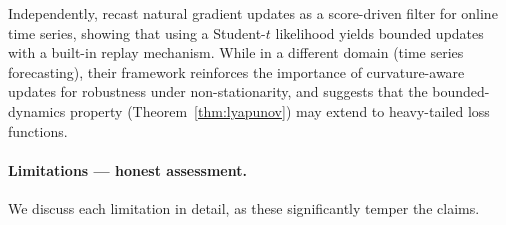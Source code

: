 \documentclass{article}
\theoremstyle{plain}
\theoremstyle{definition}
\theoremstyle{remark}
\begin{document}
Independently, \citet{urettini2026natsr} recast natural gradient updates as a score-driven filter for online time series, showing that using a Student-$t$ likelihood yields bounded updates with a built-in replay mechanism. While in a different domain (time series forecasting), their framework reinforces the importance of curvature-aware updates for robustness under non-stationarity, and suggests that the bounded-dynamics property (Theorem~\ref{thm:lyapunov}) may extend to heavy-tailed loss functions.

\paragraph{Limitations --- honest assessment.}
We discuss each limitation in detail, as these significantly temper the claims.
\end{document}
